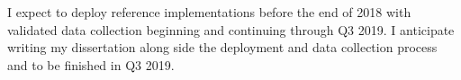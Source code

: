 %
%
%
%
%
%
%

I expect to deploy reference implementations before the end of 2018 with validated data collection beginning and continuing through Q3 2019. I anticipate writing my dissertation along side the deployment and data collection process and to be finished in Q3 2019.

